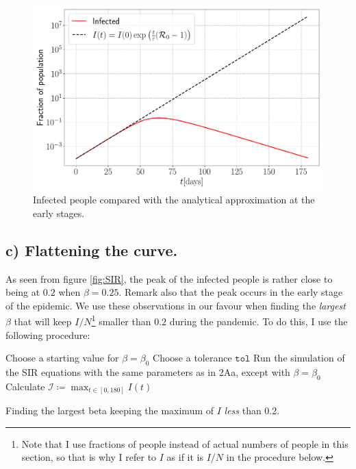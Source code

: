 \begin{figure}[htb]
	\centering
	\includegraphics[width=0.8\columnwidth]{../fig/2Ab_I.pdf}
	\caption{Infected people compared with the analytical approximation at the early stages.}
	\label{fig:Infected}
\end{figure}

\subsection{c) Flattening the curve. }

As seen from figure \ref{fig:SIR}, the peak of the infected people is rather close to being at $0.2$ when $\beta = 0.25$. Remark also that the peak occurs in the early stage of the epidemic. We use these observations in our favour when finding the \textit{largest} $\beta$ that will keep $I/N$\footnote{Note that I use fractions of people instead of actual numbers of people in this section, so that is why I refer to $I$ as if it is $I/N$ in the procedure below.} smaller than $0.2$ during the pandemic. To do this, I use the following procedure:

\begin{algorithm}[H]
	Choose a starting value for $\beta = \beta_0$\;
	Choose a tolerance $\texttt{tol}$\;
	Run the simulation of the SIR equations with the same parameters as in 2Aa, except with $\beta = \beta_0$\;
	Calculate $\mathcal{I} \coloneqq \max_{t\in[0,180]} I(t)$\;
		
	\caption{Finding the largest beta keeping the maximum of $I$ \textit{less} than 0.2.}
\end{algorithm} 

